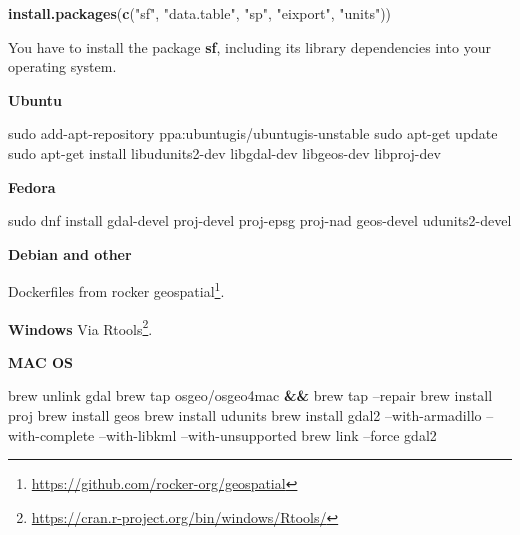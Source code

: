 \documentclass[12pt,graybox,envcountchap,sectrefs]{krantz}
\makeatletter
\newenvironment{Shaded}{\begin{snugshade}}{\end{snugshade}}
\newcommand{\KeywordTok}[1]{\textcolor[rgb]{0.13,0.29,0.53}{\textbf{#1}}}
\newcommand{\StringTok}[1]{\textcolor[rgb]{0.31,0.60,0.02}{#1}}
\newcommand{\FunctionTok}[1]{\textcolor[rgb]{0.00,0.00,0.00}{#1}}
\newcommand{\ExtensionTok}[1]{#1}
\newcommand{\NormalTok}[1]{#1}
\renewcommand{\href}[2]{#2\footnote{\url{#1}}}
\newenvironment{kframe}{%
\medskip{}
\setlength{\fboxsep}{.8em}
 \def\at@end@of@kframe{}%
 \ifinner\ifhmode%
  \def\at@end@of@kframe{\end{minipage}}%
  \begin{minipage}{\columnwidth}%
 \fi\fi%
 \def\FrameCommand##1{\hskip\@totalleftmargin \hskip-\fboxsep
 \colorbox{shadecolor}{##1}\hskip-\fboxsep
     \hskip-\linewidth \hskip-\@totalleftmargin \hskip\columnwidth}%
 \MakeFramed {\advance\hsize-\width
   \@totalleftmargin\z@ \linewidth\hsize
   \@setminipage}}%
 {\par\unskip\endMakeFramed%
 \at@end@of@kframe}
\renewenvironment{Shaded}{\begin{kframe}}{\end{kframe}}
\theoremstyle{definition}
\theoremstyle{definition}
\theoremstyle{definition}
\theoremstyle{remark}
\makeatother
\begin{document}
\begin{Shaded}
\begin{Highlighting}[]
\KeywordTok{install.packages}\NormalTok{(}\KeywordTok{c}\NormalTok{(}\StringTok{"sf"}\NormalTok{, }\StringTok{"data.table"}\NormalTok{, }\StringTok{"sp"}\NormalTok{, }\StringTok{"eixport"}\NormalTok{, }\StringTok{"units"}\NormalTok{))}
\end{Highlighting}
\end{Shaded}

You have to install the package \textbf{sf}, including its library
dependencies into your operating system.

\textbf{Ubuntu}

\begin{Shaded}
\begin{Highlighting}[]
\FunctionTok{sudo}\NormalTok{ add-apt-repository ppa:ubuntugis/ubuntugis-unstable}
\FunctionTok{sudo}\NormalTok{ apt-get update}
\FunctionTok{sudo}\NormalTok{ apt-get install libudunits2-dev libgdal-dev libgeos-dev libproj-dev }
\end{Highlighting}
\end{Shaded}

\textbf{Fedora}

\begin{Shaded}
\begin{Highlighting}[]
\FunctionTok{sudo}\NormalTok{ dnf install gdal-devel proj-devel proj-epsg proj-nad }
\ExtensionTok{geos-devel}\NormalTok{ udunits2-devel}
\end{Highlighting}
\end{Shaded}

\textbf{Debian and other}

Dockerfiles from \href{https://github.com/rocker-org/geospatial}{rocker
geospatial}.

\textbf{Windows} Via
\href{https://cran.r-project.org/bin/windows/Rtools/}{Rtools}.

\textbf{MAC OS}

\begin{Shaded}
\begin{Highlighting}[]
\ExtensionTok{brew}\NormalTok{ unlink gdal}
\ExtensionTok{brew}\NormalTok{ tap osgeo/osgeo4mac }\KeywordTok{&&} \ExtensionTok{brew}\NormalTok{ tap --repair}
\ExtensionTok{brew}\NormalTok{ install proj}
\ExtensionTok{brew}\NormalTok{ install geos}
\ExtensionTok{brew}\NormalTok{ install udunits}
\ExtensionTok{brew}\NormalTok{ install gdal2 --with-armadillo --with-complete }
\ExtensionTok{--with-libkml}\NormalTok{ --with-unsupported}
\ExtensionTok{brew}\NormalTok{ link --force gdal2}
\end{Highlighting}
\end{Shaded}
\end{document}
